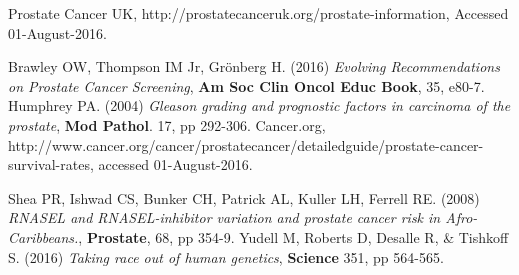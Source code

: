 \documentclass[final]{article}
\begin{document}
\begin{thebibliography}{1}
    Prostate Cancer UK,
    http://prostatecanceruk.org/prostate-information,
    Accessed 01-August-2016.

    Brawley OW, Thompson IM Jr, Grönberg H.
    (2016)
    \emph{Evolving Recommendations on Prostate Cancer Screening},
    \textbf{Am Soc Clin Oncol Educ Book},
    35,
    e80-7.
    Humphrey PA.
    (2004)
    \emph{Gleason grading and prognostic factors in carcinoma of the prostate},
    \textbf{Mod Pathol}.
    17,
    pp 292-306.
    Cancer.org,
    http://www.cancer.org/cancer/prostatecancer/detailedguide/prostate-cancer-survival-rates,
    accessed 01-August-2016.

    Shea PR, Ishwad CS, Bunker CH, Patrick AL, Kuller LH, Ferrell RE.
    (2008)
    \emph{RNASEL and RNASEL-inhibitor variation and prostate cancer risk in Afro-Caribbeans.},
    \textbf{Prostate},
    68,
    pp 354-9.
    Yudell M, Roberts D, Desalle R, \& Tishkoff S.
    (2016)
    \emph{Taking race out of human genetics},
    \textbf{Science}
    351,
    pp 564-565.
\end{thebibliography}
\end{document}
